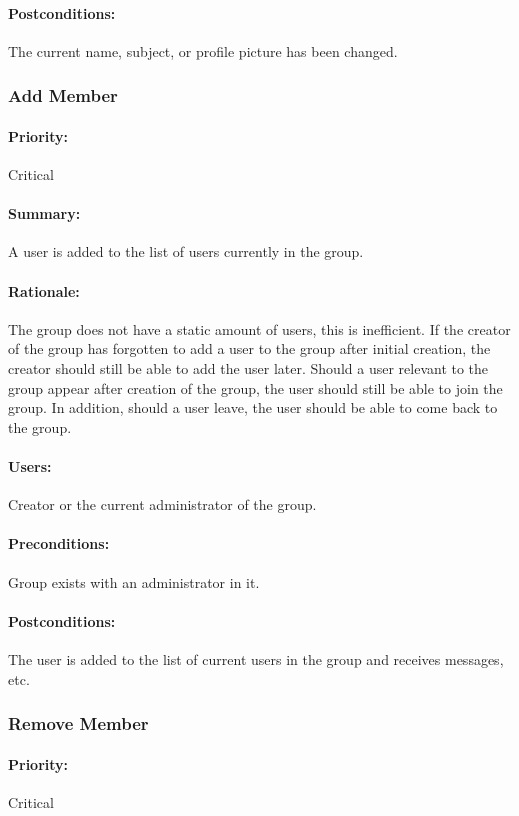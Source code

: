 \documentclass[11pt]{article}
\begin{document}
\paragraph{{Postconditions:}}
The current name, subject, or profile picture has been changed.
\subsubsection{Add Member} \label{UC-add-member}
\paragraph{Priority:} Critical
\paragraph{Summary:}
A user is added to the list of users currently in the group.
\paragraph{Rationale:}
The group does not have a static amount of users, this is inefficient. If the creator of the group has forgotten to add a user to the group after initial creation, the creator should still be able to add the user later. Should a user relevant to the group appear after creation of the group, the user should still be able to join the group. In addition, should a user leave, the user should be able to come back to the group.
\paragraph{Users:}
Creator or the current administrator of the group.
\paragraph{Preconditions:}
Group exists with an administrator in it.
\paragraph{{Postconditions:}}
The user is added to the list of current users in the group and receives messages, etc.
\subsubsection{Remove Member} \label{UC-remove-member}
\paragraph{Priority:} Critical
\end{document}
